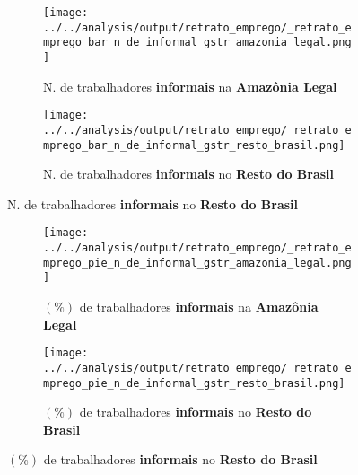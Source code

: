 \documentclass[11pt]{beamer}
\begin{document}
\begin{frame}[label=_retrato_emprego_bar_n_de_informal_gstr]{}
\textit{\hyperlink{indice_principal}{}}
\begin{figure}
\centering
\begin{subfigure}{.5\textwidth}
  \centering
  \texttt{[image: ../../analysis/output/retrato\_emprego/\_retrato\_emprego\_bar\_n\_de\_informal\_gstr\_amazonia\_legal.png]}
  \label{fig:_retrato_emprego_bar_n_de_informal_gstr_amazonia_legal}
  \caption{{\tiny N. de trabalhadores \textbf{informais} na \textbf{Amazônia Legal}}}
\end{subfigure}%
\begin{subfigure}{.5\textwidth}
  \centering
  \texttt{[image: ../../analysis/output/retrato\_emprego/\_retrato\_emprego\_bar\_n\_de\_informal\_gstr\_resto\_brasil.png]}
  \label{fig:_retrato_emprego_bar_n_de_informal_gstr_resto_brasil}
   \caption{{\tiny N. de trabalhadores \textbf{informais} no \textbf{Resto do Brasil}}}
\end{subfigure}
\end{figure}
\end{frame}


\begin{frame}[label=_retrato_emprego_pie_n_de_informal_gstr]{}
\textit{\hyperlink{indice_principal}{}}
\begin{figure}
\centering
\begin{subfigure}{.5\textwidth}
  \centering
  \texttt{[image: ../../analysis/output/retrato\_emprego/\_retrato\_emprego\_pie\_n\_de\_informal\_gstr\_amazonia\_legal.png]}
  \label{fig:_retrato_emprego_pie_n_de_informal_gstr_amazonia_legal}
  \caption{{\tiny $(\%)$ de trabalhadores \textbf{informais} na \textbf{Amazônia Legal}}}
\end{subfigure}%
\begin{subfigure}{.5\textwidth}
  \centering
  \texttt{[image: ../../analysis/output/retrato\_emprego/\_retrato\_emprego\_pie\_n\_de\_informal\_gstr\_resto\_brasil.png]}
  \label{fig:_retrato_emprego_pie_n_de_informal_gstr_resto_brasil}
   \caption{{\tiny $(\%)$ de trabalhadores \textbf{informais} no \textbf{Resto do Brasil}}}
\end{subfigure}
\end{figure}
\end{frame}
\end{document}
